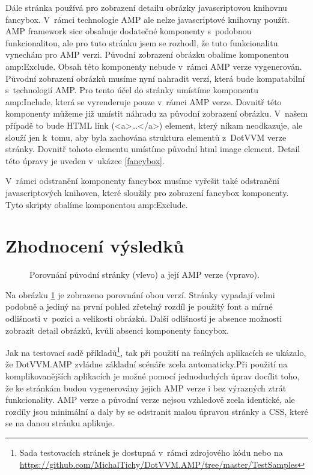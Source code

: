 Dále stránka používá pro zobrazení detailu obrázky javascriptovou knihovnu fancybox. V~rámci technologie AMP ale nelze javascriptové knihovny použít. AMP framework sice obsahuje dodatečné komponenty s~podobnou funkcionalitou, ale pro tuto stránku jsem se rozhodl, že tuto funkcionalitu vynechám pro AMP verzi. Původní zobrazení obrázku obalíme komponentou amp:Exclude. Obsah této komponenty nebude v~rámci AMP verze vygenerován. Původní zobrazení obrázků musíme nyní nahradit verzí, která bude kompatabilní s~technologií AMP. Pro tento účel do stránky umístíme komponentu amp:Include, která se vyrenderuje pouze v~rámci AMP verze. Dovnitř této komponenty můžeme již umístit náhradu za původní zobrazení obrázku. V~našem případě to bude HTML link (<a>\ldots</a>) element, který nikam neodkazuje, ale slouží jen k~tomu, aby byla zachována struktura elementů z~DotVVM verze stránky. Dovnitř tohoto elementu umístíme původní html image element. Detail této úpravy je uveden v~ukázce \ref{fancybox}.

V~rámci odstranění komponenty fancybox musíme vyřešit také odstranění javascriptových knihoven, které sloužily pro zobrazení fancybox komponenty. Tyto skripty obalíme komponentou amp:Exclude.




\section{Zhodnocení výsledků}

\begin{figure}[!h]
	\caption{Porovnání původní stránky (vlevo) a její AMP verze (vpravo).}
	\label{originalVSamp}
\end{figure}

Na obrázku \ref{originalVSamp} je zobrazeno porovnání obou verzí. Stránky vypadají velmi podobně a jediný na první pohled zřetelný rozdíl je použitý font a mírné odlišnosti v~pozici a velikosti obrázků. Další odlišností je absence možnosti zobrazit detail obrázků, kvůli absenci komponenty fancybox.

Jak na testovací sadě příkladů\footnote{ Sada testovacích stránek je dostupná v~rámci zdrojového kódu nebo na \url{https://github.com/MichalTichy/DotVVM.AMP/tree/master/TestSamples}}, tak při použití na reálných aplikacích se ukázalo, že DotVVM.AMP zvládne základní scénáře zcela automaticky.Při použití na komplikovanějších aplikacích je možné pomocí jednoduchých úprav docílit toho, že ke stránkám budou vygenerovány jejich AMP verze i bez výrazných ztrát funkcionality. AMP verze a původní verze nejsou vzhledově zcela identické, ale rozdíly jsou minimální a daly by se odstranit malou úpravou stránky a CSS, které se na danou stránku aplikuje.

